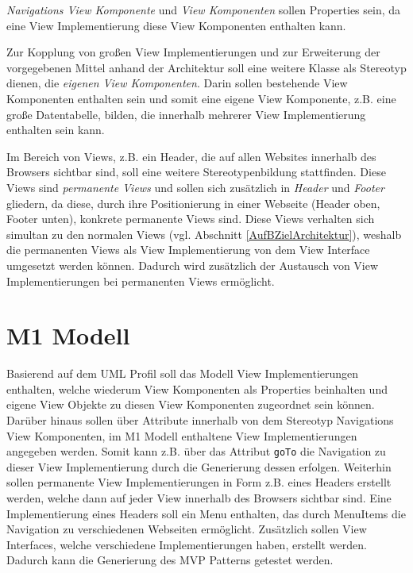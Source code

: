 \textit{Navigations View Komponente} und \textit{View Komponenten} sollen 
Properties sein, da eine View Implementierung diese View Komponenten enthalten
kann.

Zur Kopplung von großen View Implementierungen und zur Erweiterung der
vorgegebenen Mittel anhand der Architektur soll eine weitere Klasse als Stereotyp dienen, die
\textit{eigenen View Komponenten}. Darin sollen bestehende View Komponenten
enthalten sein und somit eine eigene View Komponente, z.B. eine große
Datentabelle, bilden, die innerhalb mehrerer View Implementierung enthalten sein
kann.

Im Bereich von Views, z.B. ein Header, die auf allen Websites innerhalb des
Browsers sichtbar sind, soll eine weitere Stereotypenbildung stattfinden. Diese Views
sind \textit{permanente Views} und sollen sich zusätzlich in \textit{Header} und
\textit{Footer} gliedern, da diese, durch
ihre Positionierung in einer Webseite (Header oben, Footer unten), konkrete
permanente Views sind. Diese Views verhalten sich simultan zu den normalen Views (vgl. Abschnitt \ref{AufBZielArchitektur}),
weshalb die permanenten Views als View Implementierung von dem View Interface umgesetzt werden können.
Dadurch wird zusätzlich der Austausch von View Implementierungen bei
permanenten Views ermöglicht.
\section{M1 Modell}\label{AufBM1}
Basierend auf dem UML Profil soll das Modell View Implementierungen enthalten,
welche wiederum View Komponenten als Properties beinhalten und eigene
View Objekte zu diesen View Komponenten zugeordnet sein können. Darüber hinaus
sollen über Attribute innerhalb von dem Stereotyp Navigations View Komponenten,
im M1 Modell enthaltene View Implementierungen angegeben werden. Somit kann z.B.
über das Attribut \texttt{goTo} die Navigation zu dieser View Implementierung
durch die Generierung dessen erfolgen.
Weiterhin sollen permanente View Implementierungen in Form z.B. eines
Headers erstellt werden, welche dann auf jeder View innerhalb des Browsers
sichtbar sind. Eine Implementierung eines Headers soll ein Menu enthalten,
das durch MenuItems die Navigation zu verschiedenen Webseiten ermöglicht.
Zusätzlich sollen View Interfaces, welche verschiedene
Implementierungen haben, erstellt werden. Dadurch kann die Generierung des
MVP Patterns getestet werden.
